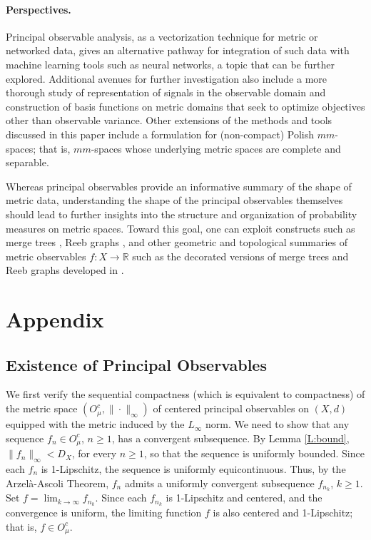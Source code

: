 \documentclass[11pt]{article}
\theoremstyle{definition}
\newcommand{\real}{\ensuremath{\mathbb{R}}}
\newcommand{\cobs}[1]{\ensuremath{O^c_{#1}}}
\begin{document}
\paragraph{Perspectives.} Principal observable analysis, as a vectorization technique for metric or networked data, gives an alternative pathway for integration of such data with machine learning tools such as neural networks, a topic that can be further explored. Additional avenues for further investigation also include a more thorough study of representation of signals in the observable domain and construction of basis functions on metric domains that seek to optimize objectives other than observable variance. Other extensions of the methods and tools discussed in this paper include a formulation for (non-compact) Polish $mm$-spaces; that is, $mm$-spaces whose underlying metric spaces are complete and separable.

Whereas principal observables provide an informative summary of the shape of metric data, understanding the shape of the principal observables themselves should lead to further insights into the structure and organization of probability measures on metric spaces. Toward this goal, one can exploit constructs such as merge trees \cite{morozov2013}, Reeb graphs \cite{Biasotti2014}, and other geometric and topological summaries of metric observables $f \colon X \to \real$ such as the decorated  versions of merge trees and Reeb graphs developed in \cite{curry2022,curry2024}.






\appendix
\section{Appendix}

\subsection{Existence of Principal Observables} \label{A:po}

We first verify the sequential compactness (which is equivalent to compactness) of the metric space $(\cobs{\mu}, \|\cdot\|_\infty)$ of centered principal observables on $(X,d)$ equipped with the metric induced by the $L_\infty$ norm. We need to show that any sequence $f_n \in \cobs{\mu}$, $n \geq 1$, has a convergent subsequence. By Lemma \ref{L:bound}, $\|f_n\|_\infty < D_X$, for every $n \geq 1$, so that the sequence is uniformly bounded. Since each $f_n$ is 1-Lipschitz, the sequence is uniformly equicontinuous. Thus, by the Arzel\`{a}-Ascoli Theorem, $f_n$ admits a uniformly convergent subsequence $f_{n_k}$, $k \geq 1$. Set $f = \lim_{k \to \infty} f_{n_k}$. Since each $f_{n_k}$ is 1-Lipschitz and centered, and the convergence is uniform, the limiting function $f$ is also centered and 1-Lipschitz; that is, $f \in \cobs{\mu}$.
\end{document}
